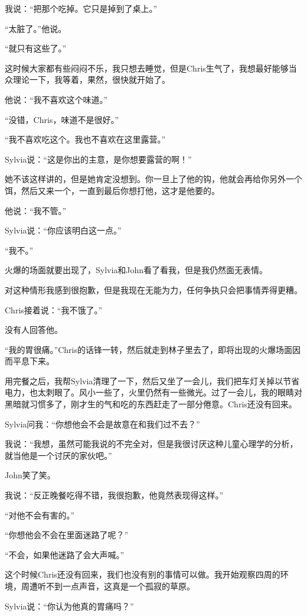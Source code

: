 \documentclass[UTF8]{article}
\begin{document}
\par 我说：“把那个吃掉。它只是掉到了桌上。”
\par “太脏了。”他说。
\par “就只有这些了。”
\par 这时候大家都有些闷闷不乐，我只想去睡觉，但是Chris生气了，我想最好能够当众理论一下，我等着，果然，很快就开始了。
\par 他说：“我不喜欢这个味道。”
\par “没错，Chris，味道不是很好。”
\par “我不喜欢吃这个。我也不喜欢在这里露营。”
\par Sylvia说：“这是你出的主意，是你想要露营的啊！”
\par 她不该这样讲的，但是她肯定没想到。你一旦上了他的钩，他就会再给你另外一个饵，然后又来一个，一直到最后你想打他，这才是他要的。
\par 他说：“我不管。”
\par Sylvia说：“你应该明白这一点。”
\par “我不。”
\par 火爆的场面就要出现了，Sylvia和John看了看我，但是我仍然面无表情。
\par 对这种情形我感到很抱歉，但是我现在无能为力，任何争执只会把事情弄得更糟。
\par Chris接着说：“我不饿了。”
\par 没有人回答他。
\par “我的胃很痛。”Chris的话锋一转，然后就走到林子里去了，即将出现的火爆场面因而平息下来。
\par 用完餐之后，我帮Sylvia清理了一下，然后又坐了一会儿，我们把车灯关掉以节省电力，也太刺眼了。风小一些了，火里仍然有一些微光。过了一会儿，我的眼睛对黑暗就习惯多了，刚才生的气和吃的东西赶走了一部分倦意。Chris还没有回来。
\par Sylvia问我：“你想他会不会是故意在和我们过不去？”
\par 我说：“我想，虽然可能我说的不完全对，但是我很讨厌这种儿童心理学的分析，就当他是一个讨厌的家伙吧。”
\par John笑了笑。
\par 我说：“反正晚餐吃得不错，我很抱歉，他竟然表现得这样。”
\par “对他不会有害的。”
\par “你想他会不会在里面迷路了呢？”
\par “不会，如果他迷路了会大声喊。”
\par 这个时候Chris还没有回来，我们也没有别的事情可以做。我开始观察四周的环境，周遭听不到一点声音，这真是一个孤寂的草原。
\par Sylvia说：“你认为他真的胃痛吗？”
\end{document}
